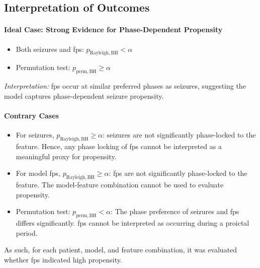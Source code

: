 \subsection{Interpretation of Outcomes} \label{subsec:interpretation-of-outcomes}

\paragraph{Ideal Case: Strong Evidence for Phase-Dependent Propensity}
\begin{itemize}
    \item Both seizures and \glspl{fp}: $p_{\mathrm{Rayleigh, BH}} < \alpha$
    \item Permutation test: $p_{\mathrm{perm, BH}} \geq \alpha$
\end{itemize}
\textit{Interpretation:} \Glspl{fp} occur at similar preferred phases as seizures, suggesting the model captures phase-dependent seizure propensity.

\paragraph{Contrary Cases}
\begin{itemize}
    \item For seizures, $p_{\mathrm{Rayleigh, BH}} \geq \alpha$: seizures are not significantly phase-locked to the feature.
    Hence, any phase locking of \glspl{fp} cannot be interpreted as a meaningful proxy for propensity.
    \item For model \glspl{fp}, $p_{\mathrm{Rayleigh, BH}} \geq \alpha$: \glspl{fp} are not significantly phase-locked to the feature.
    The model-feature combination cannot be used to evaluate propensity.
    \item Permutation test: $p_{\mathrm{perm, BH}} < \alpha$: The phase preference of seizures and \glspl{fp} differs significantly.
    \Glspl{fp} cannot be interpreted as occurring during a proictal period.
\end{itemize}

As such, for each patient, model, and feature combination, it was evaluated whether \glspl{fp} indicated high propensity.